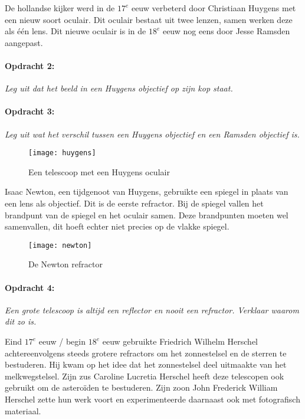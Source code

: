 De hollandse kijker werd in de $17^{e}$ eeuw verbeterd door Christiaan
Huygens met een nieuw soort oculair. Dit oculair bestaat uit twee
lenzen, samen werken deze als één lens. Dit nieuwe oculair is in de
$18^{e}$ eeuw nog eens door Jesse Ramsden aangepast.


\paragraph*{Opdracht 2:}

\emph{Leg uit dat het beeld in een Huygens objectief op zijn kop staat.}


\paragraph*{Opdracht 3:}

\emph{Leg uit wat het verschil tussen een Huygens objectief en een
Ramsden objectief is.}

\begin{figure}[H]
\noindent \begin{centering}
\texttt{[image: huygens]}
\par\end{centering}

\caption{Een telescoop met een Huygens oculair}
\end{figure}


Isaac Newton, een tijdgenoot van Huygens, gebruikte een spiegel in
plaats van een lens als objectief. Dit is de eerste refractor. Bij
de spiegel vallen het brandpunt van de spiegel en het oculair samen.
Deze brandpunten moeten wel samenvallen, dit hoeft echter niet precies
op de vlakke spiegel.

\begin{figure}[H]
\noindent \begin{centering}
\texttt{[image: newton]}
\par\end{centering}

\caption{De Newton refractor}
\end{figure}


\paragraph*{Opdracht 4:}

\emph{Een grote telescoop is altijd een reflector en nooit een refractor.
Verklaar waarom dit zo is.}

Eind $17^{e}$ eeuw / begin $18^{e}$ eeuw gebruikte Friedrich Wilhelm
Herschel achtereenvolgens steeds grotere refractors om het zonnestelsel
en de sterren te bestuderen. Hij kwam op het idee dat het zonnestelsel
deel uitmaakte van het melkwegstelsel. Zijn zus Caroline Lucretia
Herschel heeft deze telescopen ook gebruikt om de asteroïden te bestuderen.
Zijn zoon John Frederick William Herschel zette hun werk voort en
experimenteerde daarnaast ook met fotografisch materiaal.


